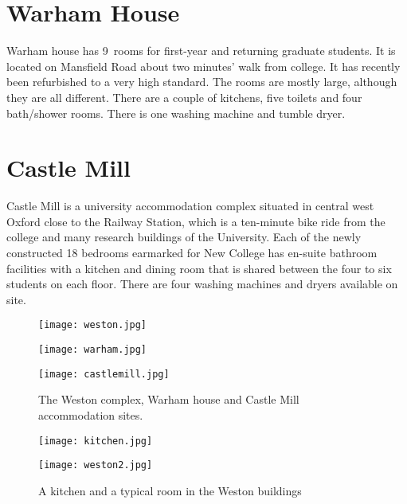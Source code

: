 \section{Warham House}
Warham house has 9~rooms for first-year and returning graduate students. It is located on Mansfield Road about two minutes' walk from college. It has recently been refurbished to a very high standard. The rooms are mostly large, although they are all different. There are a couple of kitchens, five toilets and four bath/shower rooms. There is one washing machine and tumble dryer.

\section{Castle Mill}
Castle Mill is a university accommodation complex situated in
central west Oxford close to the Railway Station, which is a ten-minute bike ride from the college and many research buildings of
the University. Each of the newly constructed 18 bedrooms earmarked for New
College has en-suite bathroom facilities with a kitchen and dining room that is shared between
the four to six students on each floor. There are four washing machines and
dryers available on site.

\begin{figure}[htbp]
\centering
		\begin{minipage}{0.28\textwidth}
                \texttt{[image: weston.jpg]}
        \end{minipage}%
        \quad
        \begin{minipage}{0.28\textwidth}
                \texttt{[image: warham.jpg]}
        \end{minipage}%
        \quad
        \begin{minipage}{0.35\textwidth}      
                \texttt{[image: castlemill.jpg]}
        \end{minipage}%
        \caption[]{The Weston complex,
        Warham house and Castle Mill accommodation sites.}
        \label{fig:accomm}
\end{figure}

\begin{figure}[htbp]
\centering
		\begin{minipage}{0.50\textwidth}
                \texttt{[image: kitchen.jpg]}
        \end{minipage}%
        \quad
        \begin{minipage}{0.46\textwidth}
                \texttt{[image: weston2.jpg]}
        \end{minipage}%
\caption[]{A kitchen and a typical room
in the Weston buildings}
\label{fig:weston}
\end{figure}



